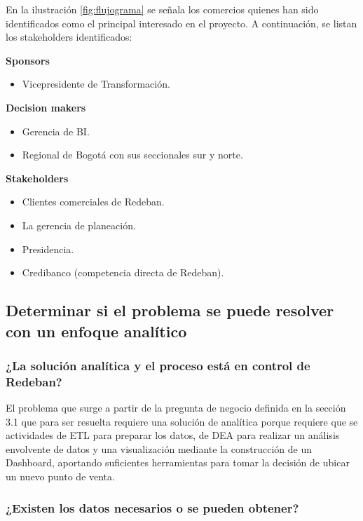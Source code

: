 \documentclass[a4paper]{article}
\begin{document}
En la ilustración \ref{fig:flujograma} se señala los comercios quienes han sido identificados como el principal interesado en el proyecto. A continuación, se listan los stakeholders identificados:

\textbf{Sponsors}

\begin{itemize}
	\item Vicepresidente de Transformación.
\end{itemize}

\textbf{Decision makers}

\begin{itemize}
	\item Gerencia de BI.
	\item Regional de Bogotá con sus seccionales sur y norte.
\end{itemize}

\textbf{Stakeholders}
\begin{itemize}
	\item Clientes comerciales de Redeban.
	\item La gerencia de planeación.
	\item Presidencia.
	\item Credibanco (competencia directa de Redeban).
\end{itemize}

\subsection{Determinar si el problema se puede resolver con un enfoque analítico}

\subsubsection{¿La solución analítica y el proceso está en control de Redeban?}

El problema que surge a partir de la pregunta de negocio definida en la sección 3.1 que para ser resuelta requiere una solución de analítica porque requiere que se actividades de ETL para preparar los datos, de DEA para realizar un análisis envolvente de datos y una visualización mediante la construcción de un Dashboard, aportando suficientes herramientas para tomar la decisión de ubicar un nuevo punto de venta.

\subsubsection{¿Existen los datos necesarios o se pueden obtener?}
\end{document}

